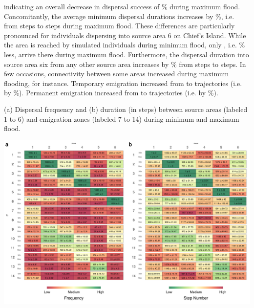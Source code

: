\documentclass[abstract=on,10pt,a4paper,bibliography=totocnumbered]{article}
\begin{document}
indicating an overall decrease in dispersal success of
\% during maximum flood.
Concomitantly, the average minimum dispersal durations increases by
\%, i.e. from
 steps to
 steps during maximum flood. These
differences are particularly pronounced for individuals dispersing into source
area 6 on Chief's Island. While the area is reached by
 simulated individuals during minimum
flood, only , i.e.
\% less, arrive there during maximum
flood. Furthermore, the dispersal duration into source area six from any other
source area increases by \% from
 steps to
 steps. In few occasions,
connectivity between some areas increased during maximum flooding, for instance.
Temporary emigration increased from 
to  trajectories (i.e.
by \%). Permanent emigration increased
from  to
 trajectories (i.e.
by \%).

\begin{table}
 \caption{(a) Dispersal frequency and (b) duration (in steps) between source
  areas (labeled 1 to 6) and emigration zones (labeled 7 to 14) during minimum
  and maximum flood.}
 \label{IPCTable}
 \includegraphics[width = \textwidth]{99_IPCTable.png}
\end{table}
\end{document}
